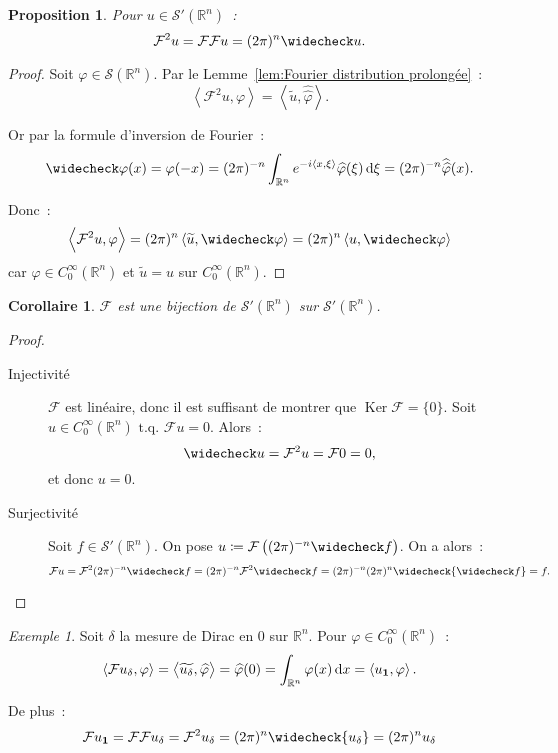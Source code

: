\documentclass{report}
\DeclareMathOperator{\Ker}{Ker}
\newcommand{\R}{{\mathbb R}}
\newcommand{\scpr}[2]{\left\langle#1, #2\right\rangle}
\newcommand{\tq}{\text{ t.q. }}
\newcommand{\st}{\tq}
\newtheorem{prp}[thm]{Proposition}
\newtheorem{cor}[thm]{Corollaire}
\theoremstyle{definition}
\theoremstyle{remark}
\newtheorem{ex}{Exemple}[chapter]
\begin{document}
\begin{prp} Pour $u \in \mathcal S'(\R^n)$~:
\[\mathcal F^2u = \mathcal F\mathcal Fu = (2\pi)^n\widecheck u.\]
\end{prp}

\begin{proof} Soit $\varphi \in \mathcal S(\R^n)$. Par le Lemme~\ref{lem:Fourier distribution prolongée}~:
\[\scpr {\mathcal F^2u}\varphi = \scpr {\widetilde u}{\widehat {\widehat \varphi}}.\]

Or par la formule d'inversion de Fourier~:
\[\widecheck \varphi(x) = \varphi(-x) = (2\pi)^{-n}\int_{\R^n}e^{-i\scpr x\xi}\widehat \varphi(\xi)\dif \xi = (2\pi)^{-n}\widehat {\widehat \varphi}(x).\]

Donc~:
\[\scpr {\mathcal F^2u}\varphi = (2\pi)^n\scpr {\widetilde u}{\widecheck \varphi} = (2\pi)^n\scpr u{\widecheck \varphi}\]
car $\varphi \in C^\infty_0(\R^n)$ et $\widetilde u = u$ sur $C^\infty_0(\R^n)$.
\end{proof}

\begin{cor} $\mathcal F$ est une bijection de $\mathcal S'(\R^n)$ sur $\mathcal S'(\R^n)$.
\end{cor}

\begin{proof}~
\begin{description}
	\item[Injectivité] $\mathcal F$ est linéaire, donc il est suffisant de montrer que $\Ker\mathcal F = \{0\}$. Soit $u \in C^\infty_0(\R^n) \st \mathcal Fu = 0$. Alors~:
	\[\widecheck u = \mathcal F^2u = \mathcal F0 = 0,\]
	et donc $u = 0$.
	\item[Surjectivité] Soit $f \in \mathcal S'(\R^n)$. On pose $u \coloneqq \mathcal F\left((2\pi)^{-n}\widecheck f\right)$. On a alors~:
	\[\mathcal Fu = \mathcal F^2(2\pi)^{-n}\widecheck f = (2\pi)^{-n}\mathcal F^2\widecheck f = (2\pi)^{-n}(2\pi)^n\widecheck {\widecheck f} = f.\]
\end{description}
\end{proof}

\begin{ex} Soit $\delta$ la mesure de Dirac en 0 sur $\R^n$. Pour $\varphi \in C^\infty_0(\R^n)$~:
\[\scpr {\mathcal Fu_\delta}\varphi = \scpr {\widetilde {u_\delta}}{\widehat \varphi} = \widehat \varphi(0) = \int_{\R^n}\varphi(x)\dif x = \scpr {u_\mathbf 1}\varphi.\]

De plus~:
\[\mathcal Fu_{\mathbf 1} = \mathcal F\mathcal Fu_\delta = \mathcal F^2u_\delta = (2\pi)^n \widecheck {u_{\delta}} = (2\pi)^n u_{\delta}\]
\end{ex}
\end{document}
